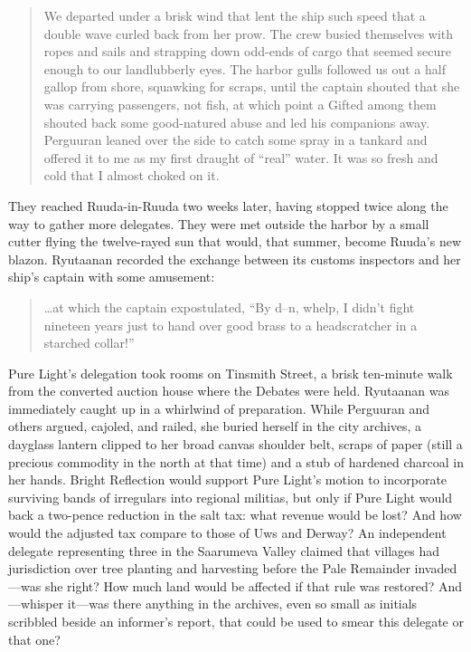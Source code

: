 \documentclass[12pt]{report}
\begin{document}
\begin{quotation}
We departed under a brisk wind that lent the ship such speed that a
double wave curled back from her prow.  The crew busied themselves
with ropes and sails and strapping down odd-ends of cargo that seemed
secure enough to our landlubberly eyes.  The harbor gulls followed us
out a half gallop from shore, squawking for scraps, until the captain
shouted that she was carrying passengers, not fish, at which point a
Gifted among them shouted back some good-natured abuse and led his
companions away.  Perguuran leaned over the side to catch some spray
in a tankard and offered it to me as my first draught of ``real'' water.
It was so fresh and cold that I almost choked on it.
\end{quotation}

They reached Ruuda-in-Ruuda two weeks later, having stopped twice
along the way to gather more delegates.  They were met outside the
harbor by a small cutter flying the twelve-rayed sun that would, that
summer, become Ruuda's new blazon.  Ryutaanan recorded the exchange
between its customs inspectors and her ship's captain with some
amusement:

\begin{quotation}
{\ldots}at which the captain expostulated, ``By d--n, whelp, I didn't
fight nineteen years just to hand over good brass to a headscratcher
in a starched collar!''
\end{quotation}

Pure Light's delegation took rooms on Tinsmith Street, a brisk
ten-minute walk from the converted auction house where the Debates
were held.  Ryutaanan was immediately caught up in a whirlwind of
preparation.  While Perguuran and others argued, cajoled, and railed,
she buried herself in the city archives, a dayglass lantern clipped to
her broad canvas shoulder belt, scraps of paper (still a precious
commodity in the north at that time) and a stub of hardened charcoal
in her hands.  Bright Reflection would support Pure Light's motion to
incorporate surviving bands of irregulars into regional militias, but
only if Pure Light would back a two-pence reduction in the salt tax:
what revenue would be lost?  And how would the adjusted tax compare to
those of Uws and Derway?  An independent delegate representing three
 in the Saarumeva Valley claimed that villages had
jurisdiction over tree planting and harvesting before the Pale
Remainder invaded---was she right?  How much land would be affected if
that rule was restored?  And---whisper it---was there anything in the
archives, even so small as initials scribbled beside an informer's
report, that could be used to smear this delegate or that one?
\end{document}
